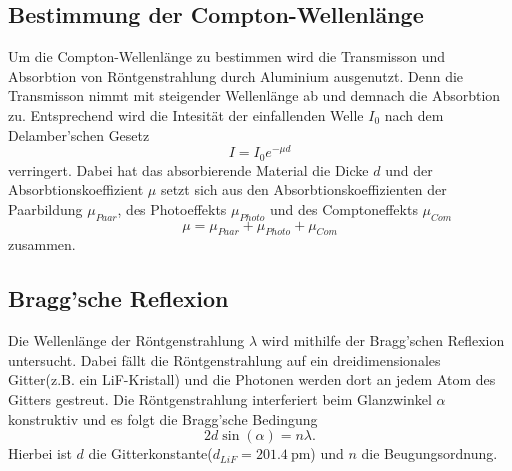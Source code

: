 \subsection{Bestimmung der Compton-Wellenlänge}
Um die Compton-Wellenlänge zu bestimmen wird die Transmisson und Absorbtion von Röntgenstrahlung durch Aluminium ausgenutzt.
Denn die Transmisson nimmt mit steigender Wellenlänge ab und demnach die Absorbtion zu. Entsprechend wird die Intesität der
einfallenden Welle $I_0$ nach dem Delamber'schen Gesetz
\begin{equation}
    I = I_0 e^{-\mu d}
\end{equation}
verringert. Dabei hat das absorbierende Material die Dicke $d$ und der Absorbtionskoeffizient $\mu$ setzt sich aus den Absorbtionskoeffizienten
der Paarbildung $\mu_{Paar}$, des Photoeffekts $\mu_{Photo}$ und des Comptoneffekts $\mu_{Com}$
\begin{equation*}
    \mu = \mu_{Paar} + \mu_{Photo} + \mu_{Com}
\end{equation*}
zusammen.
\subsection{Bragg'sche Reflexion}
Die Wellenlänge der Röntgenstrahlung $\lambda$ wird mithilfe der Bragg'schen Reflexion untersucht. Dabei fällt die Röntgenstrahlung auf ein dreidimensionales
Gitter(z.B. ein LiF-Kristall) und die Photonen werden dort an jedem Atom des Gitters gestreut. Die Röntgenstrahlung interferiert beim Glanzwinkel $\alpha$ konstruktiv
und es folgt die Bragg'sche Bedingung
\begin{equation}
    \label{eqn:Bragg}
    2d\sin\left(\alpha\right) = n\lambda.
\end{equation}
Hierbei ist $d$ die Gitterkonstante($d_{LiF} = \SI{201,4}{\pico\meter}$) und $n$ die Beugungsordnung.\cite{sample}
